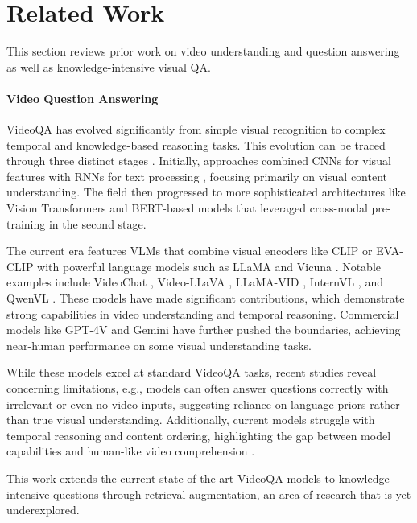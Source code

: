 \section{Related Work}
This section reviews prior work on video understanding and question answering as well as knowledge-intensive visual QA.

\paragraph{\textbf{Video Question Answering}}
VideoQA has evolved significantly from simple visual recognition to complex temporal and knowledge-based reasoning tasks. This evolution can be traced through three distinct stages \cite{xiao2024videoqa}. Initially, approaches combined CNNs for visual features with RNNs for text processing \cite{jang2017tgif, xu2017video}, focusing primarily on visual content understanding. The field then progressed to more sophisticated architectures like Vision Transformers \cite{VisionTransformer} and BERT-based models that leveraged cross-modal pre-training \cite{lei2018tvqa, fu2021violet} in the second stage.

The current era features VLMs that combine visual encoders like CLIP \cite{radford2021learning} or EVA-CLIP \cite{sun2023eva} with powerful language models such as LLaMA \cite{touvron2023llama} and Vicuna \cite{chiang2023vicuna}. Notable examples include VideoChat \cite{li2023videochat}, Video-LLaVA \cite{lin2023video}, LLaMA-VID \cite{li2025llama}, InternVL \cite{chen2024internvl}, and QwenVL \cite{bai2023qwenvl}. These models have made significant contributions, which demonstrate strong capabilities in video understanding and temporal reasoning. Commercial models like GPT-4V \cite{achiam2023gpt} and Gemini \cite{team2023gemini} have further pushed the boundaries, achieving near-human performance on some visual understanding tasks.

While these models excel at standard VideoQA tasks, recent studies \cite{xiao2024can} reveal concerning limitations, e.g., models can often answer questions correctly with irrelevant or even no video inputs, suggesting reliance on language priors rather than true visual understanding. Additionally, current models struggle with temporal reasoning and content ordering, highlighting the gap between model capabilities and human-like video comprehension \cite{bagad2023test}.

This work extends the current state-of-the-art VideoQA models to knowledge-intensive questions through retrieval augmentation, an area of research that is yet underexplored.

